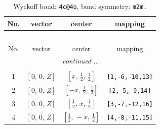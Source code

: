 \documentclass[fleqn,8pt]{jsarticle}
\begin{document}
\renewcommand{\arraystretch}{1.2}
\begin{longtable}{cccc}
\caption{Wyckoff bond: {\tt 4c@4o}, bond symmetry: {\tt m2m.}}
 \\
 \hline \hline
No. & vector & center & mapping \\ \hline \endfirsthead

\multicolumn{3}{l}{\tablename\ \thetable{}} \\
 \hline \hline
No. & vector & center & mapping \\ \hline \endhead

 \hline \hline
\multicolumn{3}{r}{\footnotesize\it continued ...} \\ \endfoot

 \hline \hline
\multicolumn{3}{r}{} \\ \endlastfoot

1 & $\left[ 0,\, 0,\, Z \right]$ & $\left[ x,\, \frac{1}{2},\, \frac{1}{2} \right]$ & {\tt [1,-6,-10,13]} \\ \hline
2 & $\left[ 0,\, 0,\, Z \right]$ & $\left[ - x,\, \frac{1}{2},\, \frac{1}{2} \right]$ & {\tt [2,-5,-9,14]} \\ \hline
3 & $\left[ 0,\, 0,\, Z \right]$ & $\left[ \frac{1}{2},\, x,\, \frac{1}{2} \right]$ & {\tt [3,-7,-12,16]} \\ \hline
4 & $\left[ 0,\, 0,\, Z \right]$ & $\left[ \frac{1}{2},\, - x,\, \frac{1}{2} \right]$ & {\tt [4,-8,-11,15]} \\
\end{longtable}
\renewcommand{\arraystretch}{1.2}
\end{document}
